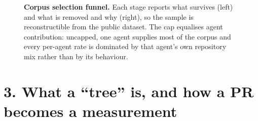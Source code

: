 \documentclass[11pt]{article}
\begin{document}
\begin{figure}[h]
{\begin{tikzpicture}[node distance=7mm]
\end{tikzpicture}}
\caption{\textbf{Corpus selection funnel.} Each stage reports what survives (left) and what is
removed and why (right), so the sample is reconstructible from the public dataset. The cap
equalises agent contribution: uncapped, one agent supplies most of the corpus and every
per-agent rate is dominated by that agent's own repository mix rather than by its behaviour.}
\end{figure}

\clearpage

\section*{3. What a ``tree'' is, and how a PR becomes a measurement}
\end{document}
